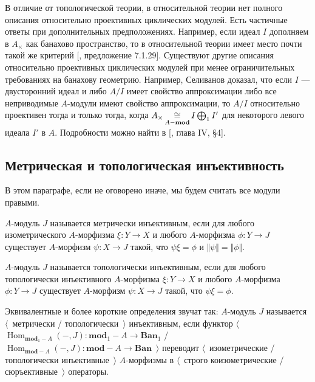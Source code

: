 В отличие от топологической теории, в относительной теории нет полного описания
относительно проективных циклических модулей. Есть частичные ответы при
дополнительных предположениях. Например, если идеал $I$ дополняем в $A_\times$
как банахово пространство, то в относительной теории имеет место почти такой же
критерий [\cite{HelBanLocConvAlg}, предложение 7.1.29]. Существуют другие
описания относительно проективных циклических модулей при менее ограничительных
требованиях на банахову геометрию. Например, Селиванов доказал, что если $I$ ---
двусторонний идеал и либо $A/I$ имеет свойство аппроксимации либо все
неприводимые $A$-модули имеют свойство аппроксимации, то $A/I$  относительно
проективен тогда и только тогда, когда
$A_\times\mathop{\mathbin{\cong}}\limits_{A-\mathbf{mod}}I\bigoplus_1 I'$ для некоторого левого идеала $I'$
в $A$. Подробности можно найти в [\cite{HelHomolBanTopAlg}, глава IV, \S 4].




\subsection{
    Метрическая и топологическая инъективность
}\label{
    SubSectionMetricAndTopologicalInjectivity
}

В этом параграфе, если не оговорено иначе, мы будем считать все модули правыми.

\begin{definition}\label{MetInjMod}
$A$-модуль $J$ называется метрически инъективным, если для любого
изометрического $A$-морфизма $\xi:Y\to X$ и любого $A$-морфизма $\phi:Y\to J$
существует $A$-морфизм $\psi:X\to J$ такой, что $\psi\xi=\phi$  и
$\Vert\psi\Vert=\Vert\phi\Vert$.
\end{definition}

\begin{definition}\label{TopInjMod}
$A$-модуль $J$ называется топологически инъективным, если для любого
топологически инъективного $A$-морфизма $\xi:Y\to X$ и любого $A$-морфизма
$\phi:Y\to J$ существует $A$-морфизм $\psi:X\to J$ такой, что $\psi\xi=\phi$.
\end{definition}

Эквивалентные и более короткие определения звучат так: $A$-модуль $J$ называется
$\langle$~метрически / топологически~$\rangle$ инъективным, если функтор
$\langle$~$\operatorname{Hom}_{\mathbf{mod}_1-A}(-,J)
:\mathbf{mod}_1-A\to\mathbf{Ban}_1$
/
$\operatorname{Hom}_{\mathbf{mod}-A}(-,J):\mathbf{mod}-A\to\mathbf{Ban}$~$\rangle$
переводит $\langle$~изометрические / топологически инъективные~$\rangle$
$A$-морфизмы в $\langle$~строго коизометрические / сюръективные~$\rangle$
операторы.

